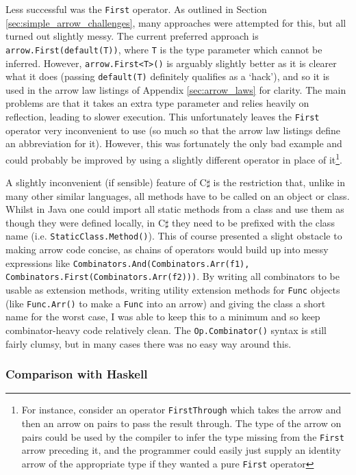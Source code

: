 \documentclass[12pt,twoside,notitlepage]{report}
\begin{document}
Less successful was the \texttt{First} operator. As outlined in Section \ref{sec:simple_arrow_challenges}, many approaches were attempted for this, but all turned out slightly messy. The current preferred approach is \texttt{arrow.First(default(T))}, where \texttt{T} is the type parameter which cannot be inferred. However, \texttt{arrow.First<T>()} is arguably slightly better as it is clearer what it does (passing \texttt{default(T)} definitely qualifies as a `hack'), and so it is used in the arrow law listings of Appendix \ref{sec:arrow_laws} for clarity. The main problems are that it takes an extra type parameter and relies heavily on reflection, leading to slower execution. This unfortunately leaves the \texttt{First} operator very inconvenient to use (so much so that the arrow law listings define an abbreviation for it). However, this was fortunately the only bad example and could probably be improved by using a slightly different operator in place of it\footnote{For instance, consider an operator \texttt{FirstThrough} which takes the arrow and then an arrow on pairs to pass the result through. The type of the arrow on pairs could be used by the compiler to infer the type missing from the \texttt{First} arrow preceding it, and the programmer could easily just supply an identity arrow of the appropriate type if they wanted a pure \texttt{First} operator}.

A slightly inconvenient (if sensible) feature of C$\sharp$ is the restriction that, unlike in many other similar languages, all methods have to be called on an object or class. Whilst in Java one could import all static methods from a class and use them as though they were defined locally, in C$\sharp$ they need to be prefixed with the class name (i.e. \texttt{StaticClass.Method()}). This of course presented a slight obstacle to making arrow code concise, as chains of operators would build up into messy expressions like \texttt{Combinators.And(Combinators.Arr(f1), Combinators.First(Combinators.Arr(f2)))}. By writing all combinators to be usable as extension methods, writing utility extension methods for \texttt{Func} objects (like \texttt{Func.Arr()} to make a \texttt{Func} into an arrow) and giving the class a short name for the worst case, I was able to keep this to a minimum and so keep combinator-heavy code relatively clean. The \texttt{Op.Combinator()} syntax is still fairly clumsy, but in many cases there was no easy way around this.

\subsubsection{Comparison with Haskell}
\end{document}
